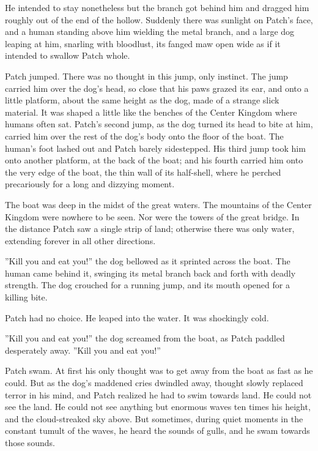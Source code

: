 \documentclass[12pt]{book}
\begin{document}
 He intended to stay nonetheless %
 but the branch got behind him and dragged him roughly out of the end of the hollow. Suddenly there was sunlight on Patch's face, and a human standing above him wielding the metal branch, and a large dog leaping at him, snarling with bloodlust, its fanged maw open wide as if it intended to swallow Patch whole.\par
 Patch jumped. There was no thought in this jump, only instinct. The jump carried him over the dog's head, so close that his paws grazed its ear, and onto a little platform, about the same height as the dog, made of a strange slick material. It was shaped a little like the benches of the Center Kingdom where humans often sat. Patch's second jump, as the dog turned its head to bite at him, carried him over the rest of the dog's body onto the floor of the boat. The human's foot lashed out and Patch barely sidestepped. His third jump took him onto another platform, at the back of the boat; and his fourth carried him onto the very edge of the boat, the thin wall of its half-shell, where he perched precariously for a long and dizzying moment.\par
The boat was deep in the midst of the great waters. The mountains of the Center Kingdom were nowhere to be seen. Nor were the towers of the great bridge. In the distance Patch saw a single strip of land; otherwise there was only water, extending forever in all other directions.\par
''Kill you and eat you!'' the dog bellowed as it sprinted across the boat. The human came behind it, swinging its metal branch back and forth with deadly strength. The dog crouched for a running jump, and its mouth opened for a killing bite.\par
Patch had no choice. He leaped into the water. It was shockingly cold.\par
''Kill you and eat you!'' the dog screamed from the boat, as Patch paddled desperately away. ''Kill you and eat you!''\par
 Patch swam. At first his only thought was to get away from the boat as fast as he could. But as the dog's maddened cries dwindled away, thought slowly replaced terror in his mind, and Patch realized he had to swim towards land. He could not see the land. He could not see anything but enormous waves ten times his height, and the cloud-streaked sky above. But sometimes, during quiet moments in the constant tumult of the waves, he heard the sounds of gulls, and he swam towards those sounds.\par
\end{document}
